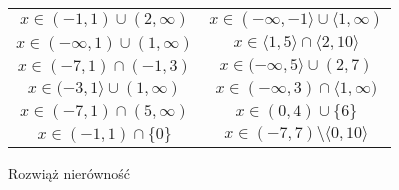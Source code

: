 \documentclass[a4paper,12pt,leqno,fleqn]{article}
\begin{document}
\begin{tabularx}{\linewidth}{@{}XX@{}}

  \begin{equation}
    x\in(-1,1)\cup(2,\infty)
  \end{equation}
&
  \begin{equation}
    x\in(-\infty,-1\rangle\cup\langle1,\infty)
  \end{equation}
\\
  \begin{equation}
    x\in(-\infty,1)\cup(1,\infty)
  \end{equation}
&
  \begin{equation}
    x\in\langle1,5\rangle\cap\langle2,10\rangle
  \end{equation}
\\
  \begin{equation}
    x\in(-7,1)\cap(-1,3)
  \end{equation}
&
  \begin{equation}
    x\in(-\infty,5\rangle\cup(2,7)
  \end{equation}
\\
  \begin{equation}
    x\in(-3,1\rangle\cup(1,\infty)
  \end{equation}
&
  \begin{equation}
    x\in(-\infty,3)\cap\langle1,\infty)
  \end{equation}
\\
  \begin{equation}
    x\in(-7,1)\cap(5,\infty)
  \end{equation}
&
  \begin{equation}
    x\in(0,4)\cup\{6\}
  \end{equation}
\\
  \begin{equation}
    x\in(-1,1)\cap\{0\}
  \end{equation}
&
  \begin{equation}
    x\in(-7,7)\setminus\langle0,10\rangle
  \end{equation}
\\
\end{tabularx}

\newpage
Rozwiąż nierówność
\end{document}
